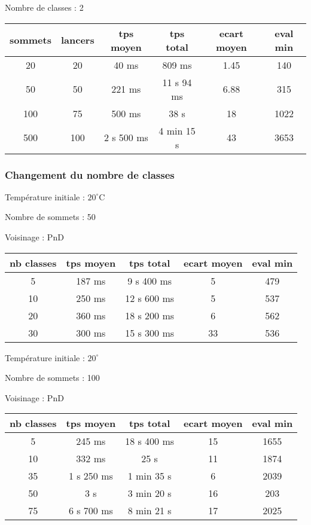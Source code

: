 \documentclass[12pt]{article}
\begin{document}
Nombre de classes : 2

\bigskip
\begin{tabular}{|c|c|c|c|c|c|}
	\hline 
	sommets & lancers & tps moyen & tps total & ecart moyen & eval min\\
	\hline
20 & 20 & 40 ms & 809 ms & 1.45 & 140 \\ 
	\hline
50  &  50  & 221 ms   &  11 s 94 ms  &   6.88  & 315\\ 
	\hline
100  &  75  &   500  ms   &  38 s &   18  &  1022   \\ 
	\hline
500  &  100  &   2 s 500   ms  & 4 min 15 s & 43  & 3653  \\
	\hline
\end{tabular}
\bigskip

\subsubsection*{Changement du nombre de classes}

Température initiale : $20^\circ$C

Nombre de sommets : 50 

Voisinage : PnD
\bigskip

\begin{tabular}{|c|c|c|c|c|}
	\hline 
	nb classes & tps moyen & tps total & ecart moyen & eval min\\
	\hline
	5 & 187 ms & 9 s 400 ms & 5 & 479 \\
	\hline
	10  &  250   ms   &  12  s   600 ms   &  5   &  537   \\
	\hline
	20 &  360   ms   &  18 s  200  ms    &  6   &   562  \\
	\hline
	30  &   300 ms  &  15 s  300  ms   &  33   &    536 \\
	\hline
\end{tabular}

\bigskip

Température initiale : $20^\circ$

Nombre de sommets : 100 

Voisinage : PnD
\bigskip

\begin{tabular}{|c|c|c|c|c|}
	\hline 
	nb classes & tps moyen & tps total & ecart moyen & eval min\\
	\hline
	5 & 245 ms & 18 s 400 ms & 15 & 1655 \\
	\hline
	10  &  332   ms   &  25  s  &  11   &  1874   \\
	\hline
	35  &   1 s 250 ms   & 1 min 35  s &   6  &   2039  \\
	\hline
	50  &   3 s & 3 min  20 s &   16 &   203  \\
	\hline
	75  &   6 s 700 ms & 8 min  21 s  &  17   &  2025   \\
	\hline
\end{tabular}
\end{document}

